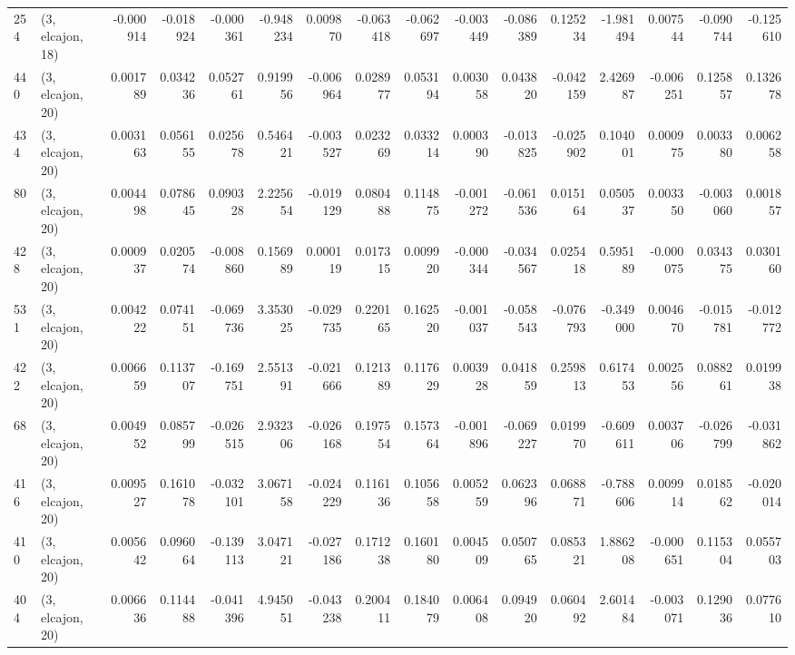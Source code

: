 \begin{tabular}{llrrrrrrrrrrrrrr}
254 &  (3, elcajon, 18) &  -0.000914 & -0.018924 & -0.000361 &   -0.948234 &  0.009870 &  -0.063418 &  -0.062697 & -0.003449 & -0.086389 &  0.125234 &   -1.981494 &  0.007544 &  -0.090744 &  -0.125610 \\
440 &  (3, elcajon, 20) &   0.001789 &  0.034236 &  0.052761 &    0.919956 & -0.006964 &   0.028977 &   0.053194 &  0.003058 &  0.043820 & -0.042159 &    2.426987 & -0.006251 &   0.125857 &   0.132678 \\
434 &  (3, elcajon, 20) &   0.003163 &  0.056155 &  0.025678 &    0.546421 & -0.003527 &   0.023269 &   0.033214 &  0.000390 & -0.013825 & -0.025902 &    0.104001 &  0.000975 &   0.003380 &   0.006258 \\
80  &  (3, elcajon, 20) &   0.004498 &  0.078645 &  0.090328 &    2.225654 & -0.019129 &   0.080488 &   0.114875 & -0.001272 & -0.061536 &  0.015164 &    0.050537 &  0.003350 &  -0.003060 &   0.001857 \\
428 &  (3, elcajon, 20) &   0.000937 &  0.020574 & -0.008860 &    0.156989 &  0.000119 &   0.017315 &   0.009920 & -0.000344 & -0.034567 &  0.025418 &    0.595189 & -0.000075 &   0.034375 &   0.030160 \\
531 &  (3, elcajon, 20) &   0.004222 &  0.074151 & -0.069736 &    3.353025 & -0.029735 &   0.220165 &   0.162520 & -0.001037 & -0.058543 & -0.076793 &   -0.349000 &  0.004670 &  -0.015781 &  -0.012772 \\
422 &  (3, elcajon, 20) &   0.006659 &  0.113707 & -0.169751 &    2.551391 & -0.021666 &   0.121389 &   0.117629 &  0.003928 &  0.041859 &  0.259813 &    0.617453 &  0.002556 &   0.088261 &   0.019938 \\
68  &  (3, elcajon, 20) &   0.004952 &  0.085799 & -0.026515 &    2.932306 & -0.026168 &   0.197554 &   0.157364 & -0.001896 & -0.069227 &  0.019970 &   -0.609611 &  0.003706 &  -0.026799 &  -0.031862 \\
416 &  (3, elcajon, 20) &   0.009527 &  0.161078 & -0.032101 &    3.067158 & -0.024229 &   0.116136 &   0.105658 &  0.005259 &  0.062396 &  0.068871 &   -0.788606 &  0.009914 &   0.018562 &  -0.020014 \\
410 &  (3, elcajon, 20) &   0.005642 &  0.096064 & -0.139113 &    3.047121 & -0.027186 &   0.171238 &   0.160180 &  0.004509 &  0.050765 &  0.085321 &    1.886208 & -0.000651 &   0.115304 &   0.055703 \\
404 &  (3, elcajon, 20) &   0.006636 &  0.114488 & -0.041396 &    4.945051 & -0.043238 &   0.200411 &   0.184079 &  0.006408 &  0.094920 &  0.060492 &    2.601484 & -0.003071 &   0.129036 &   0.077610 \\

\end{tabular}
